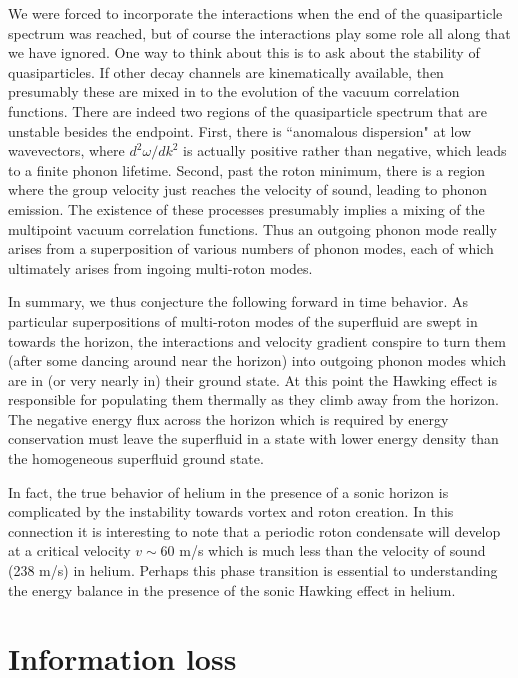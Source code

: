 \documentclass[12pt]{article}
\begin{document}
We were forced to incorporate the interactions when the end of the
quasiparticle spectrum was reached, but of course the interactions play
some role all along that we have ignored. One way to think about this
is to ask about the stability of quasiparticles. If other decay
channels are kinematically available, then presumably these are mixed
in to the evolution of the vacuum correlation functions.  There are
indeed two regions of the quasiparticle spectrum that are unstable
besides the endpoint.  First, there is  ``anomalous dispersion" at low
wavevectors, where $d^2\omega/dk^2$ is actually positive rather than
negative\cite{Grif}, which leads to a finite phonon
lifetime\cite{Pita59,Khal}.  Second,  past the roton minimum, there is
a region where the group velocity just reaches the velocity of
sound\cite{WoodCowl}, leading to phonon emission. The existence of
these processes presumably implies a mixing of the multipoint vacuum
correlation functions.
Thus an outgoing phonon mode really arises from a superposition of
various numbers of phonon modes, each of which ultimately arises from
ingoing multi-roton modes.

In summary, we thus conjecture the following forward in time behavior.
As particular superpositions of multi-roton modes of the superfluid are
swept in towards the horizon, the interactions and velocity gradient
conspire to turn them (after some dancing around near the horizon) into
outgoing phonon modes which are in (or very nearly in) their ground
state. At this point the Hawking effect is responsible for populating
them thermally as they climb away from the horizon.  The negative
energy flux across the horizon which is required by energy conservation
must leave the superfluid in a state with lower energy density than the
homogeneous superfluid ground state.

In fact, the true behavior of helium in the presence of a sonic horizon
is complicated by the instability towards vortex and roton creation. In
this connection it is interesting to note that a periodic roton
condensate will develop\cite{Pita84} at a critical velocity $v\sim 60$
m/s which is much less than the velocity of sound (238 m/s) in helium.
Perhaps this phase transition is essential to understanding the energy
balance in the presence of the sonic Hawking effect in helium.


\section{Information loss}
\end{document}
